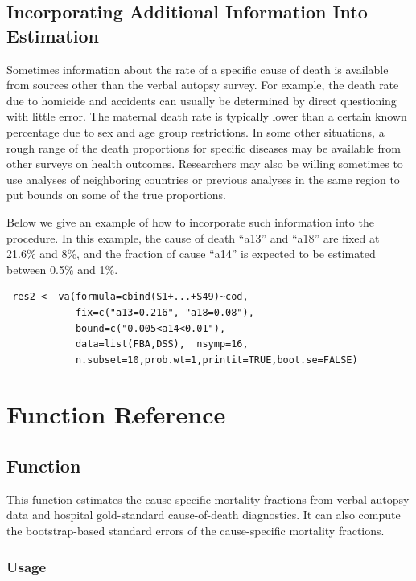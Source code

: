 \documentclass[oneside,letterpaper,titlepage]{article}
\begin{document}
\subsection{Incorporating Additional Information Into Estimation}

Sometimes information about the rate of a specific cause of death is
available from sources other than the verbal autopsy survey.  For
example, the death rate due to homicide and accidents can usually be
determined by direct questioning with little error.  The maternal
death rate is typically lower than a certain known percentage due to
sex and age group restrictions.  In some other situations, a rough
range of the death proportions for specific diseases may be available
from other surveys on health outcomes.  Researchers may also be
willing sometimes to use analyses of neighboring countries or previous
analyses in the same region to put bounds on some of the true
proportions.

Below we give an example of how to incorporate such information into
the  procedure.  In this example, the cause of death
``a13'' and ``a18'' are fixed at 21.6\% and 8\%, and the fraction of
cause ``a14'' is expected to be estimated between 0.5\% and 1\%.
\begin{verbatim}
 res2 <- va(formula=cbind(S1+...+S49)~cod, 
            fix=c("a13=0.216", "a18=0.08"),
            bound=c("0.005<a14<0.01"),
            data=list(FBA,DSS),  nsymp=16,
            n.subset=10,prob.wt=1,printit=TRUE,boot.se=FALSE)
\end{verbatim}



\section{ Function Reference}

\subsection{Function }

This function estimates the cause-specific mortality fractions from
verbal autopsy data and hospital gold-standard cause-of-death
diagnostics.  It can also compute the bootstrap-based standard errors
of the cause-specific mortality fractions.

\subsubsection{Usage}
\end{document}
